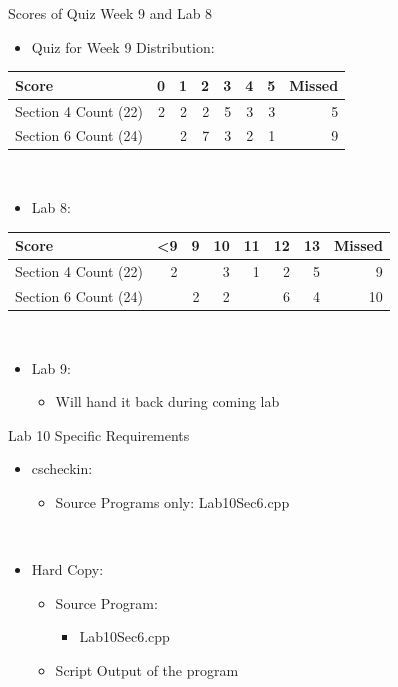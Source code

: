 \documentclass[presentation]{beamer}
\begin{document}
\begin{frame}[label=sec-10]{Scores of Quiz Week 9 and Lab 8}
\\
\begin{itemize}
\item \alert{Quiz for Week 9} Distribution:
\end{itemize}
\begin{center}
\begin{tabular}{lrrrrrrr}
\hline
Score & 0 & 1 & 2 & 3 & 4 & 5 & Missed\\
\hline
Section \alert{4} Count (22) & 2 & 2 & 2 & 5 & 3 & 3 & 5\\
\hline
Section \alert{6} Count (24) &  & 2 & 7 & 3 & 2 & 1 & 9\\
\hline
\end{tabular}
\end{center}
\\
\begin{itemize}
\item \alert{Lab 8}:
\end{itemize}
\begin{center}
\begin{tabular}{lrrrrrrr}
\hline
Score & <9 & 9 & 10 & 11 & 12 & 13 & Missed\\
\hline
Section \alert{4} Count (22) & 2 &  & 3 & 1 & 2 & 5 & 9\\
\hline
Section \alert{6} Count (24) &  & 2 & 2 &  & 6 & 4 & 10\\
\hline
\end{tabular}
\end{center}
\\
\begin{itemize}
\item \alert{Lab 9}:
\begin{itemize}
\item Will hand it back during coming lab
\end{itemize}
\end{itemize}
\end{frame}

\begin{frame}[label=sec-11]{Lab 10 Specific Requirements}
\begin{itemize}
\item \alert{cscheckin}:
\begin{itemize}
\item \alert{Source Programs} only: \alert{Lab10Sec6.cpp}
\end{itemize}
\end{itemize}
\\
\begin{itemize}
\item \alert{Hard Copy}:
\begin{itemize}
\item \alert{Source Program}: 
\begin{itemize}
\item Lab10Sec6.cpp
\end{itemize}
\item \alert{Script Output} of the program
\end{itemize}
\end{itemize}
\end{frame}
\end{document}
